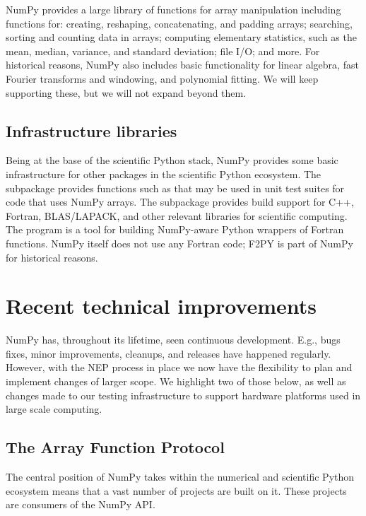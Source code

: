 NumPy provides a large library of functions for array manipulation
including functions for: creating, reshaping, concatenating, and padding arrays;
searching, sorting and counting data
in arrays; computing elementary statistics, such as the mean, median,
variance, and standard deviation; file I/O; and more.
For historical reasons, NumPy also includes basic functionality for
linear algebra,
fast Fourier transforms and windowing,
and polynomial fitting.
We will keep supporting these, but we will not expand beyond them.

\subsection*{Infrastructure libraries}

Being at the base of the scientific Python stack, NumPy provides some basic
infrastructure for other packages in the scientific Python ecosystem.
The  subpackage provides functions such as
 that may be used in unit
test suites for code that uses NumPy arrays.
The  subpackage provides build support for C++, Fortran,
BLAS/LAPACK, and other relevant libraries for scientific computing.
The program  is a tool for
building NumPy-aware Python wrappers of Fortran functions.
NumPy itself does not use any Fortran code;  F2PY is part of NumPy
for historical reasons.

\section*{Recent technical improvements}

NumPy has, throughout its lifetime, seen continuous development.
E.g., bugs fixes, minor improvements, cleanups, and releases have
happened regularly.  However, with the NEP process in place we now
have the flexibility to plan and implement changes of larger scope.
We highlight two of those below, as well as changes made to our
testing infrastructure to support hardware platforms used in large
scale computing.

\subsection*{The Array Function Protocol}

The central position of NumPy takes within the numerical and scientific
Python ecosystem means that a vast number of projects are built on it.
These projects are consumers of the NumPy API.

